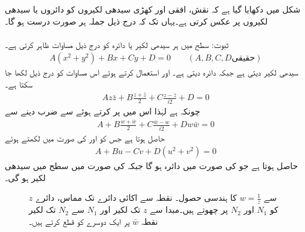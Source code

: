 شکل  میں دکھایا گیا ہے کہ  نقش،  افقی اور کھڑی سیدھی لکیروں کو دائروں یا سیدھی لکیروں پر عکس کرتی ہے۔یہاں تک کہ درج ذیل جملہ ہر صورت درست ہو گا۔\\
\\
ثبوت:  سطح میں ہر سیدھی لکیر یا دائرہ کو درج ذیل مساوات ظاہر کرتی ہے۔
\begin{align*}
A(x^2+y^2)+Bx+Cy+D=0\quad \quad (A,B,C,D \text{حقیقی})
\end{align*}
 سیدھی لکیر دیتی ہے جبکہ  دائرہ دیتی ہے۔  اور   استعمال کرتے ہوئے اس مساوات کو درج ذیل لکھا جا سکتا ہے۔
\begin{align*}
Az\bar{z}+B\frac{z+\bar{z}}{2}+C\frac{z-\bar{z}}{i2}+D=0
\end{align*}
چونکہ  ہے لہٰذا اس میں  پر کرتے ہوئے  سے ضرب دینے سے 
\begin{align*}
A+B\frac{w+\bar{w}}{2}+C\frac{\bar{w}-w}{i2}+Dw\bar{w}=0
\end{align*}
حاصل ہوتا ہے جس کو  اور  کی صورت میں لکھتے ہوئے
\begin{align*}
A+Bu-Cv+D(u^2+v^2)=0
\end{align*}
حاصل ہوتا ہے جو  کی صورت میں دائرہ ہو گا جبکہ  کی صورت میں  سطح میں سیدھی لکیر ہو گی۔ 
\begin{figure}
\centering
{}
\caption
{$z$ سے $w=\tfrac{1}{z}$ کا ہندسی حصول۔ نقطہ  سے اکائی دائرے تک مماس،  دائرے کو $N_1$ اور $N_2$ پر چھوتے ہیں۔مبدا سے $z$ تک لکیر اور $N_1$ سے $N_2$ تک لکیر نقطہ $\bar{w}$ پر ایک دوسرے کو قطع کرتے ہیں۔ }
\label{شکل_نقش_اکائی_دائرے_میں_الٹ}
\end{figure}
%


